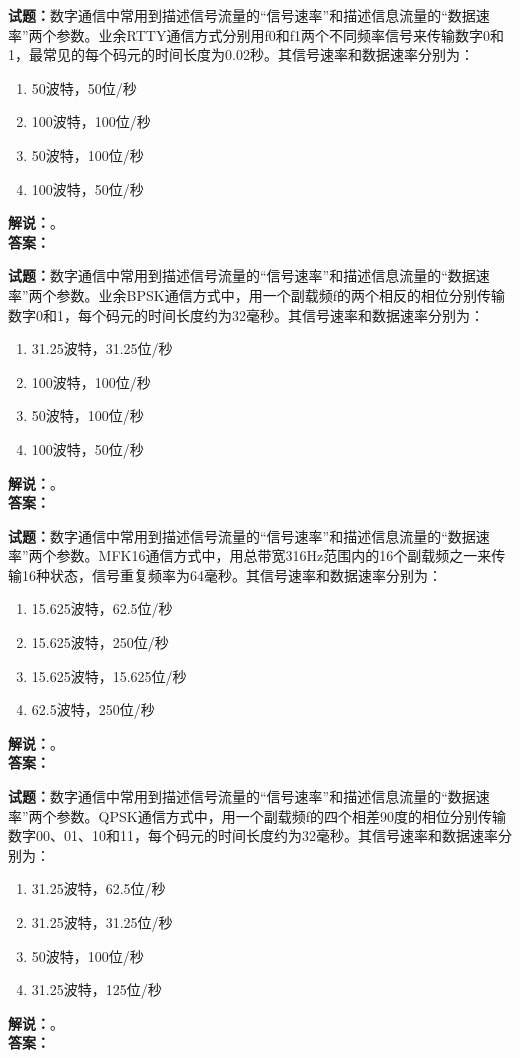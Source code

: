 \documentclass{ctexbook}
\begin{document}
\bigskip

\noindent\textbf{试题：}数字通信中常用到描述信号流量的“信号速率”和描述信息流量的“数据速率”两个参数。业余RTTY通信方式分别用f0和f1两个不同频率信号来传输数字0和1，最常见的每个码元的时间长度为0.02秒。其信号速率和数据速率分别为：
\begin{enumerate}[leftmargin=3em]
  \item 50波特，50位/秒
  \item 100波特，100位/秒
  \item 50波特，100位/秒
  \item 100波特，50位/秒
\end{enumerate}
\noindent\textbf{解说：}\textbf{}。\\\noindent\textbf{答案：}

\bigskip

\noindent\textbf{试题：}数字通信中常用到描述信号流量的“信号速率”和描述信息流量的“数据速率”两个参数。业余BPSK通信方式中，用一个副载频f的两个相反的相位分别传输数字0和1，每个码元的时间长度约为32毫秒。其信号速率和数据速率分别为：
\begin{enumerate}[leftmargin=3em]
  \item 31.25波特，31.25位/秒
  \item 100波特，100位/秒
  \item 50波特，100位/秒
  \item 100波特，50位/秒
\end{enumerate}
\noindent\textbf{解说：}\textbf{}。\\\noindent\textbf{答案：}

\bigskip

\noindent\textbf{试题：}数字通信中常用到描述信号流量的“信号速率”和描述信息流量的“数据速率”两个参数。MFK16通信方式中，用总带宽316Hz范围内的16个副载频之一来传输16种状态，信号重复频率为64毫秒。其信号速率和数据速率分别为：
\begin{enumerate}[leftmargin=3em]
  \item 15.625波特，62.5位/秒
  \item 15.625波特，250位/秒
  \item 15.625波特，15.625位/秒
  \item 62.5波特，250位/秒
\end{enumerate}
\noindent\textbf{解说：}\textbf{}。\\\noindent\textbf{答案：}

\bigskip

\noindent\textbf{试题：}数字通信中常用到描述信号流量的“信号速率”和描述信息流量的“数据速率”两个参数。QPSK通信方式中，用一个副载频f的四个相差90度的相位分别传输数字00、01、10和11，每个码元的时间长度约为32毫秒。其信号速率和数据速率分别为：
\begin{enumerate}[leftmargin=3em]
  \item 31.25波特，62.5位/秒
  \item 31.25波特，31.25位/秒
  \item 50波特，100位/秒
  \item 31.25波特，125位/秒
\end{enumerate}
\noindent\textbf{解说：}\textbf{}。\\\noindent\textbf{答案：}
\end{document}
